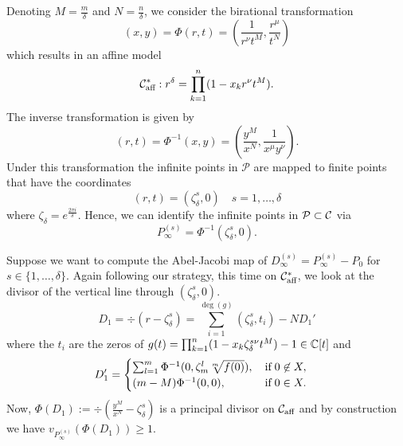 \documentclass[main.tex]{subfiles}
\begin{document}
  Denoting $M = \frac{m}\delta$ and $N = \frac{n}\delta$, we consider the birational transformation
  \begin{equation}
   (x,y) = \Phi(r,t) = \left(\frac{1}{r^{\nu}t^M},\frac{r^{\mu}}{t^N}\right)
  \end{equation}
  which results in an affine model
  \begin{equation}
   \mathcal{C}_{\text{aff}}^{*} : r^{\delta} = \prod_{k=1}^n (1-x_kr^{\nu}t^M).
  \end{equation}
  The inverse transformation is given by
  \begin{equation}
   (r,t) = \Phi^{-1}(x,y) = \left(\frac{y^M}{x^N},\frac{1}{x^{\mu}y^{\nu}}\right).
  \end{equation}
  Under this transformation the infinite points in $\mathcal{P}$ are mapped to finite points that have the coordinates
  \begin{equation}
   (r,t) = (\zeta_{\delta}^s,0) \quad s= 1,\dots,\delta
  \end{equation}
  where $\zeta_{\delta} = e^{\frac{2\pi i }{\delta}}$. 
  Hence, we can identify the infinite points in $\mathcal{P} \subset \mathcal{C}$ via
   \begin{equation}
      P_{\infty}^{(s)} = \Phi^{-1}(\zeta_{\delta}^s,0).
   \end{equation}
   
   
   Suppose we want to compute the Abel-Jacobi map of $D_{\infty}^{(s)} = P_{\infty}^{(s)} - P_0$ for $s \in \{1,\dots,\delta\}$.
   Again following our strategy,
   this time on $\mathcal{C}_{\text{aff}}^{*}$, we look at the divisor of the vertical line through $(\zeta_{\delta}^s,0)$.
   \begin{equation}
      D_1 = \div(r - \zeta_{\delta}^s) = \sum_{i = 1}^{\deg(g)} (\zeta_{\delta}^s,t_i) - N D_1'
   \end{equation}
      where the $t_i$ are the zeros of $g(t) = \prod_{k=1}^n (1-x_k\zeta_{\delta}^{s\nu}t^M) - 1 \in \mathbb{C}[t]$ and
    \begin{equation}
       D_1' = \begin{cases}
             \sum_{l=1}^m \Phi^{-1}(0,\zeta_m^l \sqrt[m]{f(0)}), \quad \text{if} \; 0 \not\in X,\\
             (m-M) \Phi^{-1}(0,0), \hfill \text{if} \; 0 \in X.
            \end{cases}
    \end{equation}
    Now, $\Phi(D_1) := \div \left( \frac{y^M}{x^N} - \zeta_{\delta}^s \right)$ is a principal divisor on $\mathcal{C}_{\text{aff}}$ and by
    construction we have $v_{P_{\infty}^{(s)}}(\Phi(D_1)) \ge 1$.
    
\end{document}
